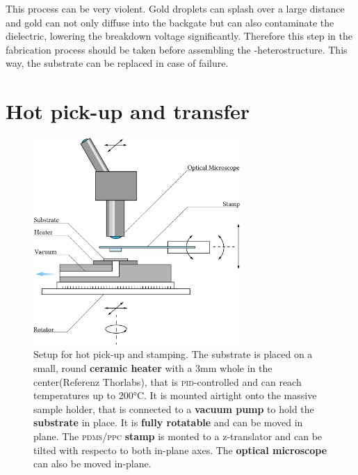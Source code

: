 This process can be very violent. Gold droplets can splash over a large distance and gold can not only diffuse into the backgate but can also contaminate the \sio dielectric, lowering the breakdown voltage significantly. Therefore this step in the fabrication process should be taken before assembling the \tmd-\hbng heterostructure. This way, the substrate can be replaced in case of failure.

\section{Hot pick-up and transfer}\label{hot_pickup}

\begin{figure}
	\centering
	\includegraphics[width=0.7\textwidth]{Stempelaufbau.png}

	\caption{Setup for hot pick-up and stamping. The substrate is placed on a small, round \textbf{ceramic heater} with a 3mm whole in the center(Referenz Thorlabs), that is \textsc{pid}-controlled and can reach temperatures up to 200°C. It is mounted airtight onto the massive sample holder, that is connected to a \textbf{vacuum pump} to hold the \textbf{substrate} in place. It is \textbf{fully rotatable} and can be moved in plane. The \textsc{pdms/ppc} \textbf{stamp} is monted to a z-translator and can be tilted with respecto to both in-plane axes. The \textbf{optical microscope} can also be moved in-plane.}
	\label{stamping-setup}
\end{figure}

